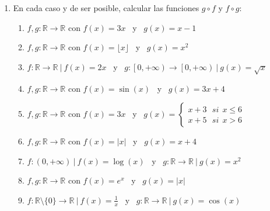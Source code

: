 \documentclass[a4paper]{article}
\newcommand{\answer}{\item[**]}
\newcommand{\exercise}{\item}
\begin{document}
\begin{enumerate}
\begin{multicols}{2}
\begin{enumerate} [label=(\alph*)]
		\item ~\\ [-12pt] \texttt{[image: func3.png]} \vfill
		\answer $f: \mathbb{R} \to \mathbb{R} ~|~ f(x)=\left\{\begin{matrix}~~~x+1 ~~~~~~~si~ x\leq1 \\(x-1)^2-1 ~~~si~ 1<x \end{matrix}\right.$

		\item ~\\ [-12pt] \texttt{[image: func4.png]} \vfill
		\answer $f: [0,24] \to \mathbb{R} ~|~ f(x)=\left\{\begin{matrix}~x ~~~~ si~ x\in [0,10)\setminus\{5\}~~ \\10 ~~~~ si~ x\in\{5\}\cup[10,15) \\~5 ~~~~ si~ x\in[15,24]~~~~~~\end{matrix}\right.$

	\end{enumerate}
	\end{multicols}

	\exercise En cada caso y de ser posible, calcular las funciones $g \circ f$ y $f \circ g$:
	\begin{enumerate} [label=(\alph*)]
		\item $f,g:\mathbb{R} \to \mathbb{R}$ con $f(x)=3x$ ~y~ $g(x)=x-1$
		\item $f,g:\mathbb{R} \to \mathbb{R}$ con $f(x)=\lfloor x \rfloor$ ~y~ $g(x)=x^2$
		\item $f:\mathbb{R} \to \mathbb{R} ~|~ f(x)=2x$ ~y~ $g:\left[0,+\infty\right) \to \left[0,+\infty\right) ~|~ g(x)=\sqrt{x}$
		\item $f,g:\mathbb{R} \to \mathbb{R}$ con $f(x)=\sin(x)$ ~y~ $g(x)=3x+4$
		\item $f,g:\mathbb{R} \to \mathbb{R}$ con $f(x)=3x$ ~y~ $g(x)=\left\{\begin{matrix}x+3 ~~~ si ~~x\leq 6\\ x+5 ~~~ si ~~x>6\end{matrix}\right.$
		\item $f,g:\mathbb{R} \to \mathbb{R}$ con $f(x)=|x|$ ~y~ $g(x)=x+4$
		\item $f:\left(0,+\infty\right) ~|~ f(x)=\log(x)$ ~y~ $g:\mathbb{R} \to \mathbb{R} ~|~ g(x)=x^2$
		\item $f,g:\mathbb{R} \to \mathbb{R}$ con $f(x)=e^{x}$ ~y~ $g(x)=|x|$
		\item $f:\mathbb{R}\setminus\{0\} \to \mathbb{R} ~|~ f(x)=\displaystyle{\frac{1}{x}}$ ~y~ $g:\mathbb{R} \to \mathbb{R} ~|~ g(x)=\cos(x)$


\end{enumerate}
\end{enumerate}
\end{document}
